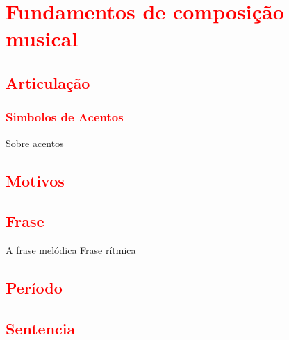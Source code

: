 
\chapter{\textcolor{red}{Fundamentos de composição musical}}

\section{\textcolor{red}{Articulação}}


\subsection{\textcolor{red}{Simbolos de Acentos}}

Sobre acentos  \cite[pp. 9]{phillips2002sight}

\section{\textcolor{red}{Motivos}}

\section{\textcolor{red}{Frase}}
\cite[pp. 150]{medteoria}


A frase melódica
Frase rítmica
\section{\textcolor{red}{Período}}
\section{\textcolor{red}{Sentencia}}
